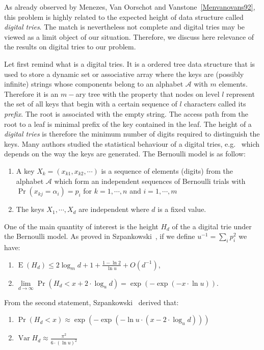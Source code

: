 \documentclass{sig-alternate}
\newcommand{\dd}{d}
\DeclareMathOperator{\Var}{Var}
\DeclareMathOperator{\Exp}{E}
\newcommand{\bigO}{O}
\begin{document}
\medskip 

As already observed by Menezes, Van Oorschot and Vanstone~\ref{Menvanovans92}, this problem is highly related to the expected height of data structure called \emph{digital tries}. The match is nevertheless not complete and digital tries may be viewed as a limit object of our situation. Therefore, we discuss here relevance of the results on digital tries to our problem.

Let first remind what is a digital tries. It is a ordered tree data structure that is used to store a dynamic set or associative array where the keys are (possibly infinite) strings whose components belong to an alphabet $\mathcal{A}$ with $m$ elements. Therefore it is an $m-$ary tree with the property that nodes on level $l$ represent the set of all keys that begin with a certain sequence of $l$ characters called its \emph{prefix}. The root is associated with the empty string. The access path from the root to a leaf is minimal prefix of the key contained in the leaf. The height of a \emph{digital tries} is therefore the minimum number of digits required to distinguish the keys. Many authors studied the statistical behaviour of a digital tries, e.g.~\cite{szpankowski1986analysis} which depends on the way the keys are generated. The Bernoulli model is as follow:
\begin{enumerate}
\item A key $X_k=(x_{k1},x_{k2}, \cdots)$ is a sequence of elements (digits) from the alphabet $\mathcal{A}$ which form an independent sequences of Bernoulli trials with 
$\Pr(x_{kj}=\alpha_i)=p_i$ for $k=1,\cdots, n$ and $i=1, \cdots, m$
\item The keys $X_1, \cdots, X_{\dd} $ are independent where $\dd$ is a fixed value.
\end{enumerate}
One of the main quantity of interest is the height $H_{\dd}$ of the a digital trie under the Bernoulli model. As proved in Szpankowski~\cite{szpankowski1986analysis}, if we define  $u^{-1}=\sum_{i} p_i^2$ we have:
\begin{enumerate}
\item $\Exp(H_{\dd}) \le 2 \log_m \dd +1 +\frac{1-\ln 2}{\ln u} + \bigO(\dd^{-1})$,
\item $\lim\limits_{\dd \to \infty} \Pr(H_\dd < x + 2 \cdot \log_u \dd)=\exp(-\exp(-x \cdot \ln u))$.
\end{enumerate}
From the second statement, Szpankowski~\cite{szpankowski1986analysis} derived that: 
\begin{enumerate}
\item $\Pr(H_\dd <x) \approx \exp(-\exp(-\ln u \cdot (x-2 \cdot \log_u \dd)))$
\item $\Var H_\dd \approx \frac{\pi^2}{6 \cdot (\ln u)^2}$
\end{enumerate}
\end{document}
